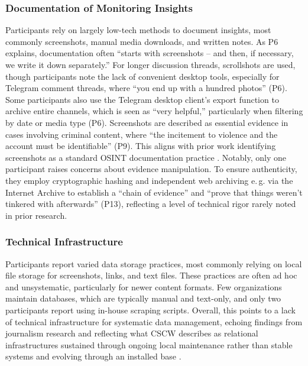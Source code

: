 \documentclass[acmsmall]{acmart}
\begin{document}
\subsubsection{Documentation of Monitoring Insights}
Participants rely on largely low-tech methods to document insights, most commonly screenshots, manual media downloads, and written notes. As P6 explains, documentation often ``starts with screenshots -- and then, if necessary, we write it down separately.'' For longer discussion threads, scrollshots are used, though participants note the lack of convenient desktop tools, especially for Telegram comment threads, where ``you end up with a hundred photos'' (P6). Some participants also use the Telegram desktop client's export function to archive entire channels, which is seen as ``very helpful,'' particularly when filtering by date or media type (P6).
Screenshots are described as essential evidence in cases involving criminal content, where ``the incitement to violence and the account must be identifiable'' (P9). This aligns with prior work identifying screenshots as a standard OSINT documentation practice \cite{mckeown_investigating_2014,baumler_harnessing_2025}. Notably, only one participant raises concerns about evidence manipulation. To ensure authenticity, they employ cryptographic hashing and independent web archiving e.\,g. via the Internet Archive \cite{internet_archive_2025} to establish a ``chain of evidence'' and ``prove that things weren’t tinkered with afterwards'' (P13), reflecting a level of technical rigor rarely noted in prior research.

\subsubsection{Technical Infrastructure}
Participants report varied data storage practices, most commonly relying on local file storage for screenshots, links, and text files. These practices are often ad hoc and unsystematic, particularly for newer content formats. Few organizations maintain databases, which are typically manual and text-only, and only two participants report using in-house scraping scripts. Overall, this points to a lack of technical infrastructure for systematic data management, echoing findings from journalism research \cite{beers_examining_2020} and reflecting what CSCW describes as relational infrastructures sustained through ongoing local maintenance rather than stable systems \cite{star_steps_1994} and evolving  through an installed base \cite{neumann_making_1996,star_steps_1994}.
\end{document}
